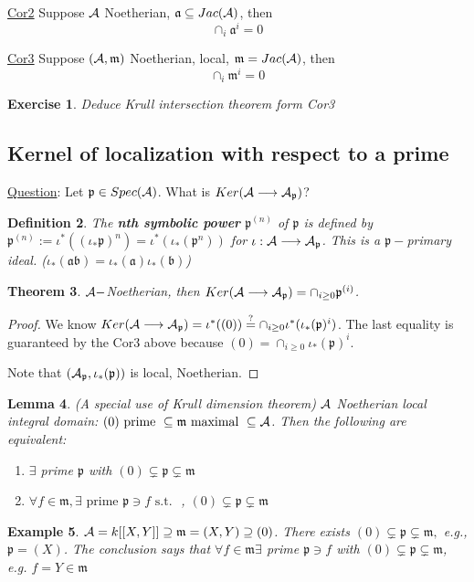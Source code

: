 \documentclass[11pt]{article}
\newtheorem{thm}{Theorem}[section]
\newtheorem{lemma}[thm]{Lemma}
\newtheorem{dfn}[thm]{Definition}
\newtheorem{ex}[thm]{Example}
\newtheorem{exercise}[thm]{Exercise}
\newcommand{\sca}{{\mathfrak a}}
\newcommand{\scb}{{\mathfrak b}}
\newcommand{\scm}{{\mathfrak m}}
\newcommand{\scp}{{\mathfrak p}}
\newcommand{\cala}{{\cal A}}
\newcommand{\lrta}{\longrightarrow}
\begin{document}
\underline{Cor2}  Suppose $\cala$ Noetherian, 
$\sca\subseteq Jac(\cala)$, then
$$\cap_i\sca^i=0$$

\underline{Cor3} Suppose $(\cala,\scm)$ Noetherian, local, $\scm=Jac(\cala)$, then
$$
\cap_i\scm^i=0
$$
\begin{exercise}
Deduce Krull intersection theorem form Cor3
\end{exercise}
\subsection*{Kernel of localization with respect to a prime}
\underline{Question}: Let $\scp\in Spec(\cala)$. What is $Ker(\cala\lrta \cala_\scp)$?
\begin{dfn}
The \textbf{nth symbolic power} $\scp^{(n)}$ of $\scp$ is defined by $\scp^{(n)}:=\iota^*((\iota_*\scp)^n)=\iota^*(\iota_*(\scp^n))$ for $\iota:\cala\lrta \cala_\scp$. This is a $\scp-$primary ideal. ($\iota_*(\sca\scb)=\iota_*(\sca)\iota_*(\scb)$)
\end{dfn}
\begin{thm}\label{thm:Noetherian_localization_kernel}
 $\cala-$Noetherian, then $ Ker(\cala\lrta \cala_\scp)=\cap_{i\geq 0}\scp^{(i)}$.
\end{thm}
\begin{proof}
We know $Ker(\cala\lrta \cala_\scp)=\iota^*((0))\overset{?}{=}\cap_{i\geq 0}\iota^*(\iota_*(\scp)^i)$.
 The last equality is guaranteed by the Cor3 above because $(0)=\cap_{i\geq 0}\iota_*(\scp)^i$. 

 Note that $(\cala_\scp,\iota_*(\scp))$ is local, Noetherian.
\end{proof}

\begin{lemma}\label{lem_5}
(A special use of Krull dimension theorem)
$\cala$ Noetherian local integral domain: $(0)\text{ prime } \subseteq \scm \text{ maximal }\subseteq \cala$. Then the following are equivalent:
\begin{enumerate}[label=(\roman*)]
\item $\exists $ prime $\scp$ with $(0)\subsetneq \scp\subsetneq \scm$
\item $\forall f\in\scm,\exists\text{ prime }\scp\ni f \text{ s.t. }$ , $(0)\subsetneq \scp\subsetneq \scm$
\end{enumerate}
\end{lemma}

\begin{ex}
$\cala=k[[X,Y]]\supseteq \scm=(X,Y)\supseteq (0)$. There exists $(0)\subsetneq\scp\subsetneq\scm,$ e.g., $\scp=(X)$. The conclusion says that $\forall f\in\scm\exists $ prime $\scp\ni f$ with  $(0)\subsetneq \scp\subsetneq \scm$, e.g. $f=Y\in\scm$
\end{ex}
\end{document}
